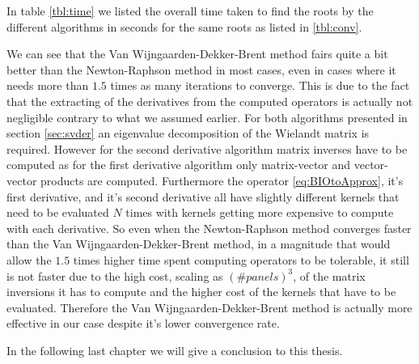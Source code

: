 \documentclass[a4paper, oneside]{discothesis}
\begin{document}
In table \ref{tbl:time} we listed the overall time taken to find the roots by the different algorithms in seconds for the same roots as listed in \ref{tbl:conv}.

\begin{table}[H]
	\centering
	\caption{Time spent in seconds until convergence for first eight minima found on our baseline problem.}
	\label{tbl:time}
\end{table}
We can see that the Van Wijngaarden-Dekker-Brent method fairs quite a bit better than the Newton-Raphson method in most cases, even in cases where it needs more than $1.5$ times as many iterations to converge.
This is due to the fact that the extracting of the derivatives from the computed operators is actually not negligible contrary to what we assumed earlier.
For both algorithms presented in section \ref{sec:svder} an eigenvalue decomposition of the Wielandt matrix is required.
However for the second derivative algorithm matrix inverses have to be computed as for the first derivative algorithm only matrix-vector and vector-vector products are computed.
Furthermore the operator \ref{eq:BIOtoApprox}, it's first derivative, and it's second derivative all have slightly different kernels that need to be evaluated $N$ times with kernels getting more expensive to compute with each derivative.
So even when the Newton-Raphson method converges faster than the Van Wijngaarden-Dekker-Brent method, in a magnitude that would allow the $1.5$ times higher time spent computing operators to be tolerable, it still is not faster due to the high cost, scaling as $(\#panels)^3$, of the matrix inversions it has to compute and the higher cost of the kernels that have to be evaluated.
Therefore the Van Wijngaarden-Dekker-Brent method is actually more effective in our case despite it's lower convergence rate.

In the following last chapter we will give a conclusion to this thesis.
\end{document}
